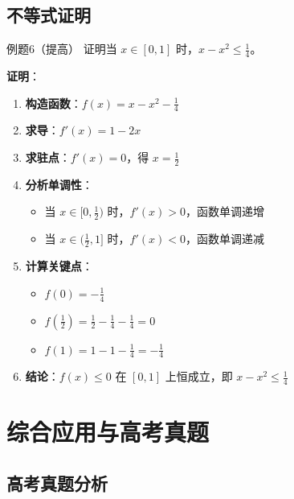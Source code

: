 \documentclass[a4paper,12pt]{ctexrep}
\begin{document}
\section{不等式证明}

\begin{examplebox}{例题6（提高）}
证明当 $x \in [0, 1]$ 时，$x - x^2 \leq \frac{1}{4}$。

\textbf{证明}：
\begin{enumerate}
    \item \textbf{构造函数}：$f(x) = x - x^2 - \frac{1}{4}$
    \item \textbf{求导}：$f'(x) = 1 - 2x$
    \item \textbf{求驻点}：$f'(x) = 0$，得 $x = \frac{1}{2}$
    \item \textbf{分析单调性}：
    \begin{itemize}
        \item 当 $x \in [0, \frac{1}{2})$ 时，$f'(x) > 0$，函数单调递增
        \item 当 $x \in (\frac{1}{2}, 1]$ 时，$f'(x) < 0$，函数单调递减
    \end{itemize}
    \item \textbf{计算关键点}：
    \begin{itemize}
        \item $f(0) = -\frac{1}{4}$
        \item $f(\frac{1}{2}) = \frac{1}{2} - \frac{1}{4} - \frac{1}{4} = 0$
        \item $f(1) = 1 - 1 - \frac{1}{4} = -\frac{1}{4}$
    \end{itemize}
    \item \textbf{结论}：$f(x) \leq 0$ 在 $[0, 1]$ 上恒成立，即 $x - x^2 \leq \frac{1}{4}$
\end{enumerate}
\end{examplebox}

\chapter{综合应用与高考真题}

\section{高考真题分析}
\end{document}
